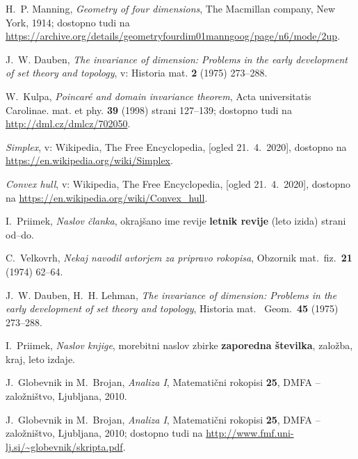 \documentclass[mat1]{fmfdelo}
\newcommand{\0}{\underline{0}}
\begin{document}
\begin{thebibliography}{99}


H.~P. Manning, \emph{Geometry of four dimensions}, The Macmillan company, New York, 1914; dostopno tudi na
\url{https://archive.org/details/geometryfourdim01manngoog/page/n6/mode/2up}.

J.~W. Dauben,  \emph{The invariance of dimension: Problems in the early development of set theory and topology}, v: Historia mat. \textbf{2} (1975) 273--288.

W.~Kulpa, \emph{Poincar\'e and domain invariance theorem}, Acta universitatis Carolinae. mat. et phy. \textbf{39} (1998) strani 127--139; dostopno tudi na
\url{http://dml.cz/dmlcz/702050}.

\emph{Simplex}, v: Wikipedia, The Free Encyclopedia, [ogled 21.~4.~2020], dostopno na \url{https://en.wikipedia.org/wiki/Simplex}.

\emph{Convex hull}, v: Wikipedia, The Free Encyclopedia, [ogled 21.~4.~2020], dostopno na \url{https://en.wikipedia.org/wiki/Convex_hull}.






I.~Priimek, \emph{Naslov članka}, okrajšano ime revije \textbf{letnik revije} (leto izida) strani od--do.

C.~Velkovrh, \emph{Nekaj navodil avtorjem za pripravo rokopisa}, Obzornik mat.\ fiz.\ \textbf{21} (1974) 62--64.

J.~W. Dauben, H.~H. Lehman, \emph{The invariance of dimension: Problems in the early development of set theory and topology}, Historia mat. \ Geom.\ \textbf{45} (1975) 273--288.


I.~Priimek, \emph{Naslov knjige}, morebitni naslov zbirke  \textbf{zaporedna številka}, založba, kraj, leto izdaje.

J.~Globevnik in M.~Brojan, \emph{Analiza I}, Matematični rokopisi \textbf{25}, DMFA -- založništvo, Ljubljana, 2010.

J.~Globevnik in M.~Brojan, \emph{Analiza I}, Matematični rokopisi \textbf{25}, DMFA -- založništvo, Ljubljana, 2010; dostopno tudi na
\url{http://www.fmf.uni-lj.si/~globevnik/skripta.pdf}.


\end{thebibliography}
\end{document}
